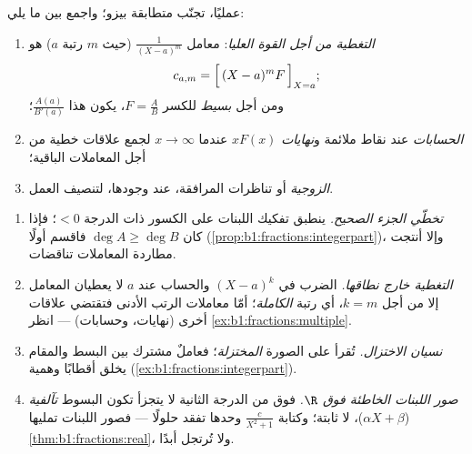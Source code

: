 \begin{method}\label{met:b1:fractions:compute}
عمليًا، تجنّب متطابقة بيزو؛ واجمع بين ما يلي:
\begin{enumerate}
  \item \emph{التغطية من أجل القوة العليا}: معامل
        $\frac{1}{(X-a)^m}$ (حيث $m$ رتبة  $a$) هو
        \[
        c_{a,m} = \Bigl[\,(X - a)^m F\,\Bigr]_{X = a};
        \]
        ومن أجل  \emph{بسيط} للكسر $F = \frac AB$، يكون هذا
        $\frac{A(a)}{B'(a)}$؛
  \item \emph{الحسابات} عند نقاط ملائمة و\emph{نهايات}
        $xF(x)$ عندما $x \to \infty$ لجمع علاقات خطية من أجل
        المعاملات الباقية؛
  \item \emph{الزوجية} أو تناظرات المرافقة، عند وجودها، لتنصيف
        العمل.
\end{enumerate}
\end{method}

\begin{remark}\label{rem:b1:fractions:pitfalls}
\begin{enumerate}
  \item \emph{تخطّي الجزء الصحيح.} ينطبق تفكيك اللبنات
        على الكسور ذات الدرجة $< 0$؛ فإذا كان $\deg A \geq
        \deg B$ فاقسم أولًا
        (\cref{prop:b1:fractions:integerpart})، وإلا أنتجت
        مطاردة المعاملات تناقضات.
  \item \emph{التغطية خارج نطاقها.} الضرب في
        $(X - a)^k$ والحساب عند $a$ لا يعطيان المعامل
        إلا من أجل $k = m$، أي رتبة  \emph{الكاملة}؛
        أمّا معاملات الرتب الأدنى فتقتضي علاقات أخرى (نهايات،
        وحسابات) --- انظر \cref{ex:b1:fractions:multiple}.
  \item \emph{نسيان الاختزال.} تُقرأ  على
        الصورة \emph{المختزلة}؛ فعاملٌ مشترك بين البسط
        والمقام يخلق أقطابًا وهمية
        (\cref{ex:b1:fractions:integerpart}).
  \item \emph{صور اللبنات الخاطئة فوق $\R$.} فوق 
        من الدرجة الثانية لا يتجزأ تكون البسوط \emph{تآلفية} ($\alpha X +
        \beta$)، لا ثابتة؛ وكتابة $\frac{c}{X^2 + 1}$ وحدها
        تفقد حلولًا --- فصور اللبنات تمليها
        \cref{thm:b1:fractions:real}، ولا تُرتجل أبدًا.
\end{enumerate}
\end{remark}

